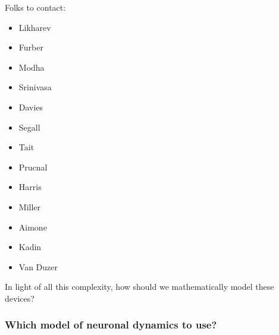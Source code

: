 \documentclass[twocolumn]{article}
\begin{document}
\vspace{3em}
Folks to contact:
\begin{itemize} 
\item Likharev
\item Furber
\item Modha
\item Srinivasa
\item Davies
\item Segall
\item Tait
\item Prucnal
\item Harris
\item Miller
\item Aimone
\item Kadin
\item Van Duzer
\end{itemize}
	
\newpage
\appendix

In light of all this complexity, how should we mathematically model these devices?

\subsubsection{Which model of neuronal dynamics to use?}





\end{document}
